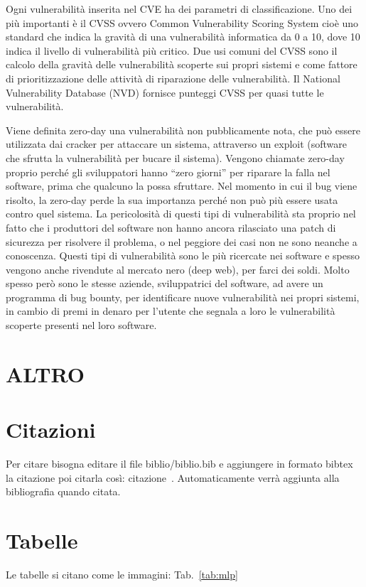Ogni vulnerabilità inserita nel CVE ha dei parametri di classificazione. 
Uno dei più importanti è il CVSS ovvero Common Vulnerability Scoring System 
cioè uno standard che indica la gravità di una vulnerabilità informatica 
da 0 a 10, dove 10 indica il livello di vulnerabilità più critico. 
Due usi comuni del CVSS sono il calcolo della gravità delle vulnerabilità 
scoperte sui propri sistemi e come fattore di prioritizzazione delle 
attività di riparazione delle vulnerabilità. Il National Vulnerability 
Database (NVD) fornisce punteggi CVSS per quasi tutte le vulnerabilità.

Viene definita zero-day una vulnerabilità non pubblicamente nota, che può 
essere utilizzata dai cracker per attaccare un sistema, attraverso un 
exploit (software che sfrutta la vulnerabilità per bucare il sistema). 
Vengono chiamate zero-day proprio perché gli sviluppatori hanno “zero giorni” 
per riparare la falla nel software, prima che qualcuno la possa sfruttare.
Nel momento in cui il bug viene risolto, la zero-day perde la sua importanza
perché non può più essere usata contro quel sistema.
La pericolosità di questi tipi di vulnerabilità sta proprio nel fatto che i 
produttori del software non hanno ancora rilasciato una patch di sicurezza 
per risolvere il problema, o nel peggiore dei casi non ne sono 
neanche a conoscenza. 
Questi tipi di vulnerabilità sono le più ricercate nei software e spesso 
vengono anche rivendute al mercato nero (deep web), per farci dei soldi.
Molto spesso però sono le stesse aziende, sviluppatrici del software, ad avere 
un programma di bug bounty, per identificare nuove vulnerabilità nei propri
sistemi, in cambio di premi in denaro per l’utente che segnala a loro
le vulnerabilità scoperte presenti nel loro software.



\section{ALTRO}
\section{Citazioni}
Per citare bisogna editare il file biblio/biblio.bib e aggiungere in formato bibtex la citazione poi citarla così: citazione~\cite{STORY}. 
Automaticamente verrà aggiunta alla bibliografia quando citata.

\section{Tabelle}
Le tabelle si citano come le immagini: Tab.~\ref{tab:mlp}

